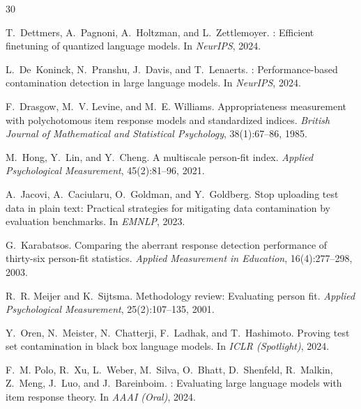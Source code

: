 \documentclass[11pt,twocolumn]{article}
\begin{document}
\begin{thebibliography}{30}

T.~Dettmers, A.~Pagnoni, A.~Holtzman, and L.~Zettlemoyer.
: Efficient finetuning of quantized language models.
\newblock In \emph{NeurIPS}, 2024.

L.~De~Koninck, N.~Pranshu, J.~Davis, and T.~Lenaerts.
: Performance-based contamination detection in large language models.
\newblock In \emph{NeurIPS}, 2024.

F.~Drasgow, M.~V. Levine, and M.~E. Williams.
\newblock Appropriateness measurement with polychotomous item response models and standardized indices.
\newblock \emph{British Journal of Mathematical and Statistical Psychology}, 38(1):67--86, 1985.

M.~Hong, Y.~Lin, and Y.~Cheng.
\newblock A multiscale person-fit index.
\newblock \emph{Applied Psychological Measurement}, 45(2):81--96, 2021.

A.~Jacovi, A.~Caciularu, O.~Goldman, and Y.~Goldberg.
\newblock Stop uploading test data in plain text: Practical strategies for mitigating data contamination by evaluation benchmarks.
\newblock In \emph{EMNLP}, 2023.

G.~Karabatsos.
\newblock Comparing the aberrant response detection performance of thirty-six person-fit statistics.
\newblock \emph{Applied Measurement in Education}, 16(4):277--298, 2003.

R.~R. Meijer and K.~Sijtsma.
\newblock Methodology review: Evaluating person fit.
\newblock \emph{Applied Psychological Measurement}, 25(2):107--135, 2001.

Y.~Oren, N.~Meister, N.~Chatterji, F.~Ladhak, and T.~Hashimoto.
\newblock Proving test set contamination in black box language models.
\newblock In \emph{ICLR (Spotlight)}, 2024.

F.~M. Polo, R.~Xu, L.~Weber, M.~Silva, O.~Bhatt, D.~Shenfeld, R.~Malkin, Z.~Meng, J.~Luo, and J.~Bareinboim.
: Evaluating large language models with item response theory.
\newblock In \emph{AAAI (Oral)}, 2024.


\end{thebibliography}
\end{document}
